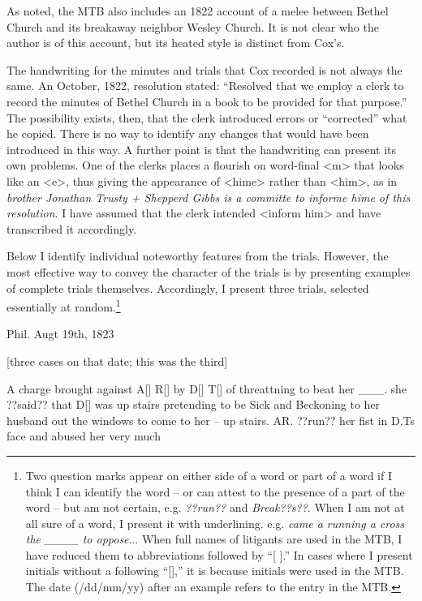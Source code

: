 \documentclass[output=paper,colorlinks,citecolor=brown]{langscibook}
\begin{document}
As noted, the MTB also includes an 1822 account of a melee between Bethel Church and its breakaway neighbor Wesley Church. It is not clear who the author is of this account, but its heated style is distinct from Cox’s.

The handwriting for the minutes and trials that Cox recorded is not always the same. An October, 1822, resolution stated: “Resolved that we employ a clerk to record the minutes of Bethel Church in a book to be provided for that purpose.” The possibility exists, then, that the clerk introduced errors or “corrected” what he copied. There is no way to identify any changes that would have been introduced in this way. A further point is that the handwriting can present its own problems. One of the clerks places a flourish on word-final <m> that looks like an <e>, thus giving the appearance of <hime> rather than <him>, as in \textit{brother Jonathan Trusty + Shepperd Gibbs is a committe to informe hime of this resolution}. I have assumed that the clerk intended <inform him> and have transcribed it accordingly.

Below I identify individual noteworthy features from the trials. However, the most effective way to convey the character of the trials is by presenting examples of complete trials themselves. Accordingly, I present three trials, selected essentially at random.\footnote{{Two question marks appear on either side of a word or part of a word if I think I can identify the word -- or can attest to the presence of a part of the word -- but am not certain, e.g.} {\textit{??run??}} {and} {\textit{Break??s??}}{. When I am not at all sure of a word, I present it with underlining. e.g.} {\textit{came a running a cross the \_\_\_\_ to oppose}}{... When full names of litigants are used in the MTB, I have reduced them to abbreviations followed by “[ ].” In cases where I present initials without a following “[],” it is because initials were used in the MTB. The date (/dd/mm/yy) after an example refers to the entry in the MTB.}}

\ea%
    \label{ex:2 singler:2}
     
  
                                         Phil. Augt 19th, 1823

[three cases on that date; this was the third]

A charge brought against A[] R[] by D[] T[] of threattning to beat her \_\_\_. she ??said?? that D[] was up stairs pretending to be Sick and Beckoning to her husband out the windows to come to her – up stairs. AR. ??run?? her fist in D.Ts face and abused her very much
\end{document}
